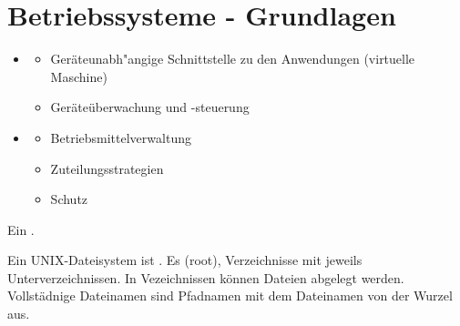 \section{Betriebssysteme - Grundlagen}

\begin{answer}
    \begin{itemize}
    \item {}
        \begin{itemize}
            \item Geräteunabh"angige Schnittstelle zu den Anwendungen (virtuelle Maschine)
            \item Geräteüberwachung und -steuerung
        \end{itemize}
    
    \item {}
        \begin{itemize}
            \item Betriebsmittelverwaltung
            \item Zuteilungsstrategien
            \item Schutz
        \end{itemize}
    \end{itemize}
\end{answer}

\begin{answer}
Ein .
\end{answer}

\begin{answer}
Ein UNIX-Dateisystem ist . Es  (root), Verzeichnisse
mit jeweils Unterverzeichnissen. In Vezeichnissen können Dateien abgelegt werden.
Vollstädnige Dateinamen sind Pfadnamen mit dem Dateinamen von der Wurzel aus.
\end{answer}

